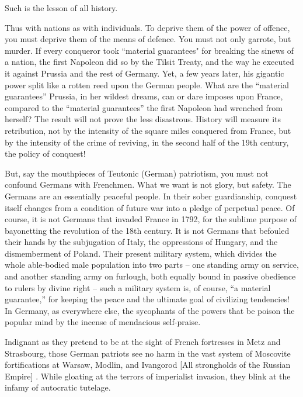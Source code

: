 \documentclass{article}
\begin{document}
Such is the lesson of all history.

Thus with nations as with individuals. To deprive them of the power of
offence, you must deprive them of the means of defence. You must not only
garrote, but murder. If every conqueror took “material guarantees" for
breaking the sinews of a nation, the first Napoleon did so by the Tilsit
Treaty, and the way he executed it against Prussia and the rest of
Germany. Yet, a few years later, his gigantic power split like a rotten
reed upon the German people. What are the “material guarantees” Prussia,
in her wildest dreams, can or dare imposes upon France, compared to the
“material guarantees” the first Napoleon had wrenched from herself? The
result will not prove the less disastrous. History will measure its
retribution, not by the intensity of the square miles conquered from
France, but by the intensity of the crime of reviving, in the second half
of the 19th century, the policy of conquest!

But, say the mouthpieces of Teutonic (German) patriotism, you must not
confound Germans with Frenchmen. What we want is not glory, but safety.
The Germans are an essentially peaceful people. In their sober
guardianship, conquest itself changes from a condition of future war into
a pledge of perpetual peace. Of course, it is not Germans that invaded
France in 1792, for the sublime purpose of bayonetting the revolution of
the 18th century. It is not Germans that befouled their hands by the
subjugation of Italy, the oppressions of Hungary, and the dismemberment of
Poland. Their present military system, which divides the whole able-bodied
male population into two parts – one standing army on service, and another
standing army on furlough, both equally bound in passive obedience to
rulers by divine right – such a military system is, of course, “a material
guarantee,” for keeping the peace and the ultimate goal of civilizing
tendencies! In Germany, as everywhere else, the sycophants of the powers
that be poison the popular mind by the incense of mendacious self-praise.

Indignant as they pretend to be at the sight of French fortresses in Metz
and Strasbourg, those German patriots see no harm in the vast system of
Moscovite fortifications at Warsaw, Modlin, and Ivangorod [All strongholds
of the Russian Empire] . While gloating at the terrors of imperialist
invasion, they blink at the infamy of autocratic tutelage.
\end{document}

